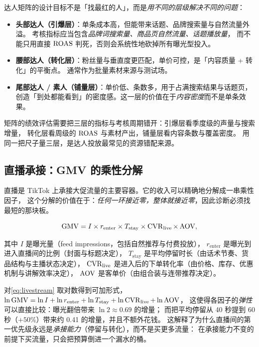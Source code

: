 达人矩阵的设计目标不是「找最红的人」，而是\emph{用不同的层级解决不同的问题}：

\begin{itemize}
  \item \textbf{头部达人（引爆层）}：单条成本高，但能带来话题、品牌搜索量与自然流量外溢。
        考核指标应当包含\emph{品牌词搜索量、商品页自然流量、话题播放量}，
        而不能只用直接 $\operatorname{ROAS}$ 判死，否则会系统性地砍掉所有曝光型投入。
  \item \textbf{腰部达人（转化层）}：粉丝量与垂直度更匹配，单价可控，是「内容质量 + 转化」的平衡点。
        通常作为批量素材来源与测试场。
  \item \textbf{尾部达人 / 素人（铺量层）}：单价低、条数多，用于占满搜索结果与话题页，
        创造「到处都能看到」的密度感。这一层的价值在于\emph{内容密度}而不是单条效果。
\end{itemize}

矩阵的绩效评估需要把三层的指标与考核周期错开：引爆层看季度级的声量与搜索增量，
转化层看周级的 $\operatorname{ROAS}$ 与素材产出，铺量层看内容条数与覆盖密度。
用同一把尺子量三层，是达人投放最常见的资源错配来源。

\subsection{直播承接：GMV 的乘性分解}

直播是 TikTok 上承接大促流量的主要容器。它的收入可以精确地分解成一串乘性因子，
这个分解的价值在于：\emph{任何一环接近零，整体就接近零}，因此诊断必须找最短的那块板。

\begin{equation}
\operatorname{GMV} = I \times r_{\text{enter}} \times T_{\text{stay}} \times \operatorname{CVR}_{\text{live}} \times \operatorname{AOV} ,
\label{eq:livestream}
\end{equation}

其中 $I$ 是曝光量（feed impressions，包括自然推荐与付费投放），
$r_{\text{enter}}$ 是曝光到进入直播间的比例（封面与标题决定），
$T_{\text{stay}}$ 是平均停留时长（由话术节奏、货品结构与主播状态决定），
$\operatorname{CVR}_{\text{live}}$ 是进入后的下单转化率（由价格、库存、优惠机制与讲解效率决定），
$\operatorname{AOV}$ 是客单价（由组合装与连带推荐决定）。

对\cref{eq:livestream} 取对数得到可加形式，$ \ln \operatorname{GMV} = \ln I + \ln r_{\text{enter}} + \ln T_{\text{stay}} + \ln \operatorname{CVR}_{\text{live}} + \ln \operatorname{AOV} $，
这使得各因子的\emph{弹性}可以直接比较：曝光翻倍带来 $\ln 2 \approx 0.69$ 的增量；
而把平均停留从 40 秒提到 60 秒（$+50\%$）带来约 0.41 的增量，并且不额外花钱。
这解释了为什么直播间的第一优先级永远是\emph{承接能力}（停留与转化），而不是买更多流量：
在承接能力不变的前提下买流量，只会把预算倒进一个漏水的桶。

